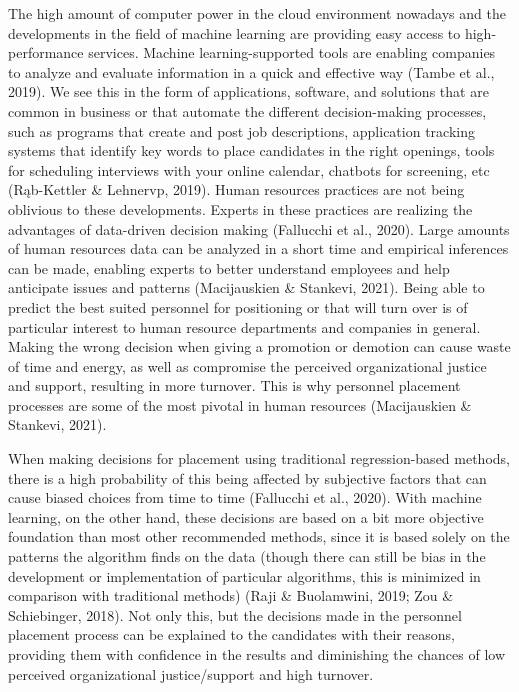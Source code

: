 \documentclass[
  man]{apa7}
\begin{document}
The high amount of computer power in the cloud environment nowadays and the developments in the field of machine learning are providing easy access to high-performance services.
Machine learning-supported tools are enabling companies to analyze and evaluate information in a quick and effective way (Tambe et al., 2019).
We see this in the form of applications, software, and solutions that are common in business or that automate the different decision-making processes, such as programs that create and post job descriptions, application tracking systems that identify key words to place candidates in the right openings, tools for scheduling interviews with your online calendar, chatbots for screening, etc (Rąb-Kettler \& Lehnervp, 2019).
Human resources practices are not being oblivious to these developments.
Experts in these practices are realizing the advantages of data-driven decision making (Fallucchi et al., 2020).
Large amounts of human resources data can be analyzed in a short time and empirical inferences can be made, enabling experts to better understand employees and help anticipate issues and patterns (Macijauskien \& Stankevi, 2021).
Being able to predict the best suited personnel for positioning or that will turn over is of particular interest to human resource departments and companies in general.
Making the wrong decision when giving a promotion or demotion can cause waste of time and energy, as well as compromise the perceived organizational justice and support, resulting in more turnover.
This is why personnel placement processes are some of the most pivotal in human resources (Macijauskien \& Stankevi, 2021).

When making decisions for placement using traditional regression-based methods, there is a high probability of this being affected by subjective factors that can cause biased choices from time to time (Fallucchi et al., 2020).
With machine learning, on the other hand, these decisions are based on a bit more objective foundation than most other recommended methods, since it is based solely on the patterns the algorithm finds on the data (though there can still be bias in the development or implementation of particular algorithms, this is minimized in comparison with traditional methods) (Raji \& Buolamwini, 2019; Zou \& Schiebinger, 2018).
Not only this, but the decisions made in the personnel placement process can be explained to the candidates with their reasons, providing them with confidence in the results and diminishing the chances of low perceived organizational justice/support and high turnover.
\end{document}
